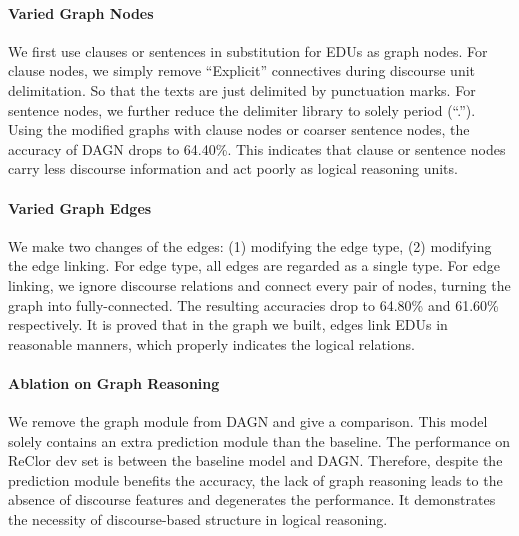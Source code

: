 \documentclass[11pt]{article}
\newcommand{\moe}[1]{{\color{black} #1}}
\begin{document}

\paragraph{Varied Graph Nodes}
We first use clauses or sentences in substitution for EDUs as graph nodes. 
For clause nodes, we simply remove ``Explicit'' connectives during discourse unit delimitation. So that the texts are just delimited by punctuation marks.
For sentence nodes, we further reduce the delimiter library to solely period (``.''). 
Using the modified graphs with clause nodes or coarser sentence nodes, the accuracy of DAGN drops to 64.40\%.
This indicates that clause or sentence nodes carry less discourse information and act poorly as logical reasoning units.


\paragraph{Varied Graph Edges} 
We make two changes of the edges: (1) modifying the edge type, (2) modifying the edge linking. 
For edge type, all edges are regarded as a single type.
For edge linking, we ignore discourse relations and connect every pair of nodes, turning the graph into fully-connected.
The resulting accuracies drop to 64.80\% and 61.60\% respectively.
It is proved that in the graph we built, edges link EDUs in reasonable manners, which properly indicates the logical relations.


\paragraph{Ablation on Graph Reasoning}
\moe{We remove the graph module from DAGN and give a comparison.}
This model solely contains an extra prediction module than the baseline. The performance on ReClor dev set is between the baseline model and DAGN. Therefore, despite the prediction module benefits the accuracy, the lack of graph reasoning leads to the absence of discourse features and degenerates the performance. It demonstrates the necessity of discourse-based structure in logical reasoning.
\end{document}

